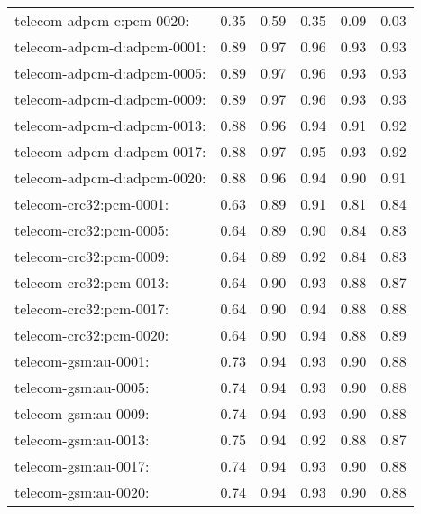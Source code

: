 \begin{longtable}{lrrrrr}
telecom-adpcm-c:pcm-0020: & 0.35 & 0.59 & 0.35 & 0.09 & 0.03 \\
telecom-adpcm-d:adpcm-0001: & 0.89 & 0.97 & 0.96 & 0.93 & 0.93 \\
telecom-adpcm-d:adpcm-0005: & 0.89 & 0.97 & 0.96 & 0.93 & 0.93 \\
telecom-adpcm-d:adpcm-0009: & 0.89 & 0.97 & 0.96 & 0.93 & 0.93 \\
telecom-adpcm-d:adpcm-0013: & 0.88 & 0.96 & 0.94 & 0.91 & 0.92 \\
telecom-adpcm-d:adpcm-0017: & 0.88 & 0.97 & 0.95 & 0.93 & 0.92 \\
telecom-adpcm-d:adpcm-0020: & 0.88 & 0.96 & 0.94 & 0.90 & 0.91 \\
telecom-crc32:pcm-0001: & 0.63 & 0.89 & 0.91 & 0.81 & 0.84 \\
telecom-crc32:pcm-0005: & 0.64 & 0.89 & 0.90 & 0.84 & 0.83 \\
telecom-crc32:pcm-0009: & 0.64 & 0.89 & 0.92 & 0.84 & 0.83 \\
telecom-crc32:pcm-0013: & 0.64 & 0.90 & 0.93 & 0.88 & 0.87 \\
telecom-crc32:pcm-0017: & 0.64 & 0.90 & 0.94 & 0.88 & 0.88 \\
telecom-crc32:pcm-0020: & 0.64 & 0.90 & 0.94 & 0.88 & 0.89 \\
telecom-gsm:au-0001: & 0.73 & 0.94 & 0.93 & 0.90 & 0.88 \\
telecom-gsm:au-0005: & 0.74 & 0.94 & 0.93 & 0.90 & 0.88 \\
telecom-gsm:au-0009: & 0.74 & 0.94 & 0.93 & 0.90 & 0.88 \\
telecom-gsm:au-0013: & 0.75 & 0.94 & 0.92 & 0.88 & 0.87 \\
telecom-gsm:au-0017: & 0.74 & 0.94 & 0.93 & 0.90 & 0.88 \\
telecom-gsm:au-0020: & 0.74 & 0.94 & 0.93 & 0.90 & 0.88 \\
\end{longtable}

